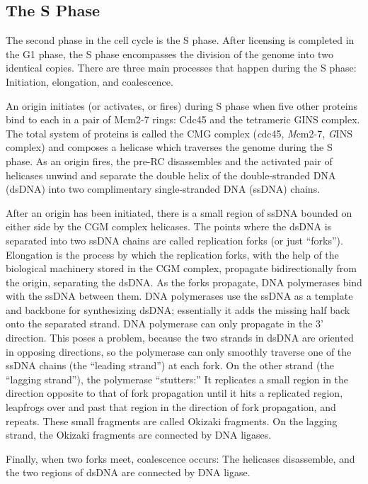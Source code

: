 		\subsection{The S Phase}
		\label{subsec:SPhase}
		
		The second phase in the cell cycle is the S phase.
		After licensing is completed in the G1 phase, the S phase encompasses the division of the genome into two identical copies.
		There are three main processes that happen during the S phase:
		Initiation, elongation, and coalescence.
		
		An origin initiates (or activates, or fires) during S phase when five other proteins bind to each in a pair of Mcm2-7 rings:
		Cdc45 and the tetrameric GINS complex.
		The total system of proteins is called the CMG complex (\emph{c}dc45, \emph{M}cm2-7, \emph{G}INS complex) and composes a helicase which traverses the genome during the S phase.
		As an origin fires, the pre-RC disassembles and the activated pair of helicases unwind and separate the double helix of the double-stranded DNA (dsDNA) into two complimentary single-stranded DNA (ssDNA) chains. \cite{GINSComplex}
		
		After an origin has been initiated, there is a small region of ssDNA bounded on either side by the CGM complex helicases.
		The points where the dsDNA is separated into two ssDNA chains are called replication forks (or just ``forks'').
		Elongation is the process by which the replication forks, with the help of the biological machinery stored in the CGM complex, propagate bidirectionally from the origin, separating the dsDNA.
		As the forks propagate, DNA polymerases bind with the ssDNA between them.
		DNA polymerases use the ssDNA as a template and backbone for synthesizing dsDNA; essentially it adds the missing half back onto the separated strand.
		DNA polymerase can only propagate in the 3' direction.
		This poses a problem, because the two strands in dsDNA are oriented in opposing directions, so the polymerase can only smoothly traverse one of the ssDNA chains (the ``leading strand'') at each fork.
		On the other strand (the ``lagging strand''), the polymerase ``stutters:''
		It replicates a small region in the direction opposite to that of fork propagation until it hits a replicated region, leapfrogs over and past that region in the direction of fork propagation, and repeats.
		These small fragments are called Okizaki fragments.
		On the lagging strand, the Okizaki fragments are connected by DNA ligases.
		
		Finally, when two forks meet, coalescence occurs:
		The helicases disassemble, and the two regions of dsDNA are connected by DNA ligase. \cite{MolecularCellBiology}
		
